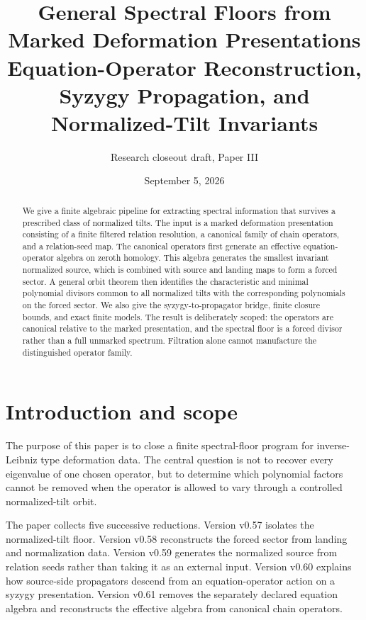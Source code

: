 \documentclass[11pt]{article}
\title{General Spectral Floors from Marked Deformation Presentations\\
\large Equation-Operator Reconstruction, Syzygy Propagation, and Normalized-Tilt Invariants}
\author{Research closeout draft, Paper III}
\date{September 5, 2026}
\theoremstyle{definition}
\begin{document}
\maketitle

\begin{abstract}
We give a finite algebraic pipeline for extracting spectral information that survives a prescribed
class of normalized tilts. The input is a marked deformation presentation consisting of a finite
filtered relation resolution, a canonical family of chain operators, and a relation-seed map. The
canonical operators first generate an effective equation-operator algebra on zeroth homology. This
algebra generates the smallest invariant normalized source, which is combined with source and
landing maps to form a forced sector. A general orbit theorem then identifies the characteristic
and minimal polynomial divisors common to all normalized tilts with the corresponding polynomials
on the forced sector. We also give the syzygy-to-propagator bridge, finite closure bounds, and exact
finite models. The result is deliberately scoped: the operators are canonical relative to the
marked presentation, and the spectral floor is a forced divisor rather than a full unmarked
spectrum. Filtration alone cannot manufacture the distinguished operator family.
\end{abstract}

\tableofcontents

\section{Introduction and scope}

The purpose of this paper is to close a finite spectral-floor program for inverse-Leibniz type
deformation data. The central question is not to recover every eigenvalue of one chosen operator,
but to determine which polynomial factors cannot be removed when the operator is allowed to vary
through a controlled normalized-tilt orbit.

The paper collects five successive reductions. Version v0.57 isolates the normalized-tilt floor.
Version v0.58 reconstructs the forced sector from landing and normalization data. Version v0.59
generates the normalized source from relation seeds rather than taking it as an external input.
Version v0.60 explains how source-side propagators descend from an equation-operator action on a
syzygy presentation. Version v0.61 removes the separately declared equation algebra and reconstructs
the effective algebra from canonical chain operators.
\end{document}
